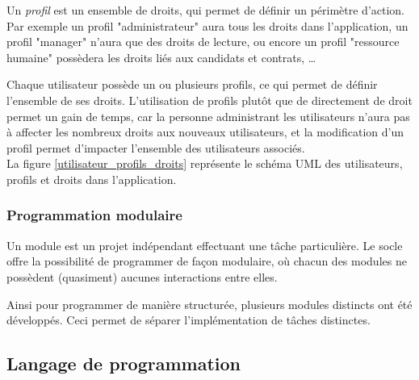 Un \textit{profil} est un ensemble de droits, qui permet de définir un périmètre d'action. Par exemple un profil "administrateur" aura tous les droits dans l'application, un profil "manager" n'aura que des droits de lecture, ou encore un profil "ressource humaine" possèdera les droits liés aux candidats et contrats, \ldots

Chaque utilisateur possède un ou plusieurs profils, ce qui permet de définir l'ensemble de ses droits. L'utilisation de profils plutôt que de directement de droit permet un gain de temps, car la personne administrant les utilisateurs n'aura pas à affecter les nombreux droits aux nouveaux utilisateurs, et la modification d'un profil permet d'impacter l'ensemble des utilisateurs associés.
\\

La figure \ref{utilisateur_profils_droits} représente le schéma UML des utilisateurs, profils et droits dans l'application.


\subsubsection{Programmation modulaire}

Un module est un projet indépendant effectuant une tâche particulière. Le socle offre la possibilité de programmer de façon modulaire, où chacun des modules ne possèdent (quasiment) aucunes interactions entre elles.

Ainsi pour programmer de manière structurée, plusieurs modules distincts ont été développés. Ceci permet de séparer l'implémentation de tâches distinctes.


\subsection{Langage de programmation}

